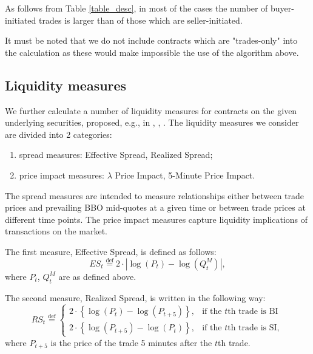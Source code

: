 \documentclass[a4paper,12pt]{article}
\theoremstyle{plain}
\theoremstyle{definition}
\begin{document}
As follows from Table \ref{table_desc}, in most of the cases the number of buyer-initiated trades is larger than of those which are seller-initiated. 

It must be noted that we do not include contracts which are "trades-only" into the calculation as these would make impossible the use of the algorithm above.


\subsection{Liquidity measures}

We further calculate a number of liquidity measures for contracts on the given underlying securities, proposed, e.g., in \citet{huang_stoll}, \citet{hasbrouck}, \citet{goyenko_et_al}. The liquidity measures we consider are divided into 2 categories:

\begin{enumerate}
\item
spread measures: Effective Spread, Realized Spread;
\item
price impact measures: $\lambda$ Price Impact, 5-Minute Price Impact.
\end{enumerate}

The spread measures are intended to measure relationships either between trade prices and prevailing BBO mid-quotes at a given time or between trade prices at different time points. The price impact measures capture liquidity implications of transactions on the market.

The first measure, Effective Spread, is defined as follows:
\begin{equation}
ES_t \stackrel{\operatorname{def}}{=} 2 \cdot |\log(P_t) - \log(Q^M_t)|,
\end{equation} 
where $P_t$, $Q^M_t$ are as defined above.

The second measure, Realized Spread, is written in the following way:
\begin{equation}
RS_t \stackrel{\operatorname{def}}{=} \left\{ \begin{array}{ll}
              2 \cdot \left\{\log(P_t) - \log(P_{t+5})\right\}, & \mbox{if the $t$th trade is BI}\\
              2 \cdot \left\{\log(P_{t+5}) - \log(P_t)\right\}, & \mbox{if the $t$th trade is SI},\end{array} \right.
\end{equation}
where $P_{t+5}$ is the price of the trade 5 minutes after the $t$th trade.
\end{document}
